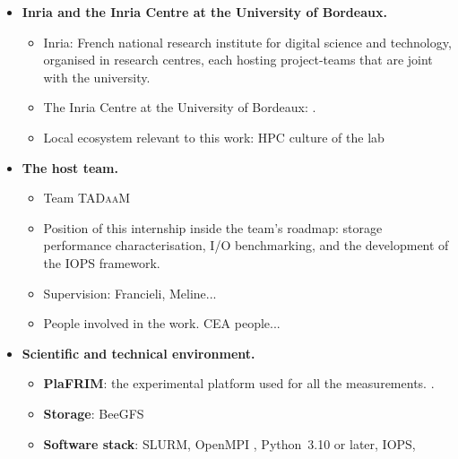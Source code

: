 \begin{itemize}

    \item \textbf{Inria and the Inria Centre at the University of Bordeaux.}
    \begin{itemize}
        \item Inria: French national research institute for digital science
              and technology, organised in research centres, each hosting
              project-teams that are  joint with the university.
        \item The Inria Centre at the University of Bordeaux:
              .
        \item Local ecosystem relevant to this work: HPC culture of the lab
    \end{itemize}

    \item \textbf{The host team.}
    \begin{itemize}
        \item Team \textsc{TADaaM}
        \item Position of this internship inside the team's roadmap: storage
              performance characterisation, I/O benchmarking, and the
              development of the IOPS framework.
        \item Supervision: Francieli, Meline...
        \item People involved in the work. CEA people... 
    \end{itemize}

    \item \textbf{Scientific and technical environment.}
    \begin{itemize}
        \item \textbf{PlaFRIM}: the experimental platform used for all the
              measurements. .
        \item \textbf{Storage}: BeeGFS 
        \item \textbf{Software stack}: SLURM, OpenMPI
              , Python~3.10 or later, IOPS,
    \end{itemize}



\end{itemize}
